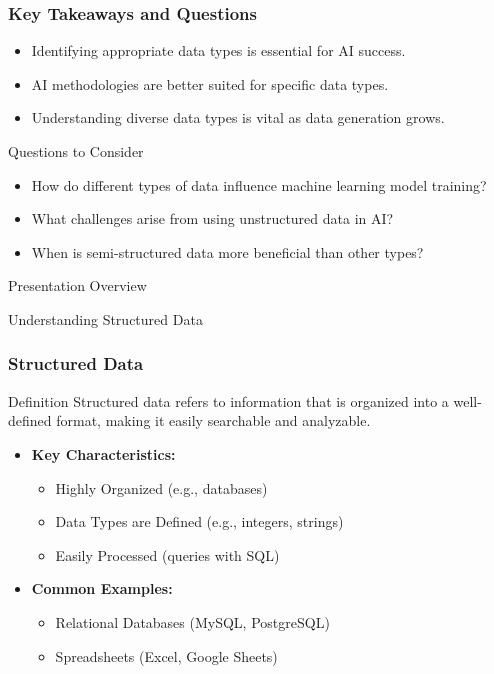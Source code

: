 \documentclass[aspectratio=169]{beamer}
\begin{document}
\begin{frame}[fragile]
    \frametitle{Key Takeaways and Questions}
    \begin{itemize}
        \item Identifying appropriate data types is essential for AI success.
        \item AI methodologies are better suited for specific data types.
        \item Understanding diverse data types is vital as data generation grows.
    \end{itemize}

    \begin{block}{Questions to Consider}
        \begin{itemize}
            \item How do different types of data influence machine learning model training?
            \item What challenges arise from using unstructured data in AI?
            \item When is semi-structured data more beneficial than other types?
        \end{itemize}
    \end{block}
\end{frame}

\begin{frame}[fragile]{Presentation Overview}
  \tableofcontents[hideallsubsections]
\end{frame}

\begin{frame}[fragile]{Understanding Structured Data}
  \frametitle{Structured Data}
  
  \begin{block}{Definition}
    Structured data refers to information that is organized into a well-defined format, making it easily searchable and analyzable.
  \end{block}
  
  \begin{itemize}
    \item \textbf{Key Characteristics:}
    \begin{itemize}
      \item Highly Organized (e.g., databases)
      \item Data Types are Defined (e.g., integers, strings)
      \item Easily Processed (queries with SQL)
    \end{itemize}
    
    \item \textbf{Common Examples:}
    \begin{itemize}
      \item Relational Databases (MySQL, PostgreSQL)
      \item Spreadsheets (Excel, Google Sheets)
    \end{itemize}
  \end{itemize}
\end{frame}
\end{document}
